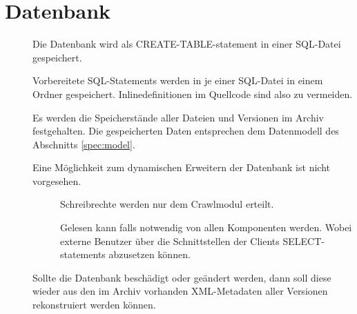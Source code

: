 \section{Datenbank} \label{spec:db}
\begin{description}
	\item []
		Die Datenbank wird als CREATE-TABLE-statement in einer SQL-Datei gespeichert.
	\item []
		Vorbereitete SQL-Statements werden in je einer SQL-Datei in einem Ordner gespeichert.
		Inlinedefinitionen im Quellcode sind also zu vermeiden.
	\item []
		Es werden die Speicherstände aller Dateien und Versionen im Archiv festgehalten.
        Die gespeicherten Daten entsprechen dem Datenmodell des Abschnitts \ref{spec:model}.
	\item [] 
		Eine Möglichkeit zum dynamischen Erweitern der Datenbank ist nicht vorgesehen.
	\item []
		\begin{description}
			\item [] Schreibrechte werden nur dem Crawlmodul erteilt.
			\item [] Gelesen kann falls notwendig von allen Komponenten werden.
				Wobei externe Benutzer über die Schnittstellen der Clients SELECT-statements abzusetzen können.
		\end{description}
	\item []
		Sollte die Datenbank beschädigt oder geändert werden, dann soll diese wieder aus den
		im Archiv vorhanden XML-Metadaten aller Versionen rekonstruiert werden können.
\end{description}
